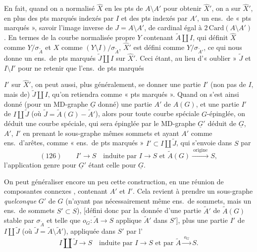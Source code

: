 \documentclass[11pt,a4paper]{article}
\begin{document}
En fait, quand on a normalisé $\hat{X}$ en les pts de $A \setminus A'$ pour obtenir $\hat{X}'$, on a sur $\hat{X}'$, en plus des pts marqués indexés par $I$ et des pts  \struck{\ill{}} indexés par $A'$, un  ens.\ de « pts marqués », savoir l'image inverse  de $J = A \setminus A'$,  de cardinal égal à $2\,\mathrm{Card}(A \setminus A')$. En termes de la courbe normalisée propre $Y$ \struck{\ill{}} contenant $\tilde{A} \amalg I$, qui définit $\hat{X}$ comme $Y/\sigma_{\tilde{A}}$ et $X$ comme $(Y \setminus I)/\sigma_{\tilde{A}}$, $\hat{X}'$ est défini comme $Y/\sigma_{\tilde{A}'}$, ce qui nous donne un ens.\ de pts marqués \struck{\ill{}} $\tilde{J} \amalg I$ sur $\hat{X}'$. Ceci étant, au lieu d'« oublier » $\tilde{J}$ et $I \setminus I'$ pour ne retenir que l'ens.\ de pts marqués

$I'$ sur $\hat{X}'$, on peut aussi, plus généralement, se donner une partie $I'$ (non pas de $I$, mais de) $\tilde{J} \amalg I$, qu'on retiendra comme « pts marqués ». Quand on s'est ainsi donné (pour un \struck{\ill{}} MD-graphe $\underline{G}$ donné) une partie $A'$ de $A(G)$, et une partie $I'$ de $I \amalg \tilde{J}$ (où $\tilde{J} = \tilde{A}(G) - \tilde{A}'$), alors pour toute courbe spéciale $G$-épinglée, on déduit une courbe spéciale, qui sera épinglée par le MD-graphe $\underline{G}'$ déduit de $\underline{G}$, $A'$, $I'$ en prenant le sous-graphe   mêmes sommets et ayant $A'$ comme ens.\ d'arêtes,  comme « ens.\ de pts marqués » $I' \subset I \amalg \tilde{J}$, qui s'envoie dans $S$ \struck{\ill{}} par
\[
(126)\qquad I' \longrightarrow S \quad \text{induite par } I \to S \text{ et } \tilde{A}(G) \xrightarrow{\ \text{origine}\ } S ,
\]
l'application genre pour $\underline{G}'$ étant celle pour $\underline{G}$.

On peut généraliser encore un peu cette construction, en   une réunion de composantes connexes , contenant $A'$ et $I'$. Cela revient à prendre un sous-graphe \emph{quelconque} $G'$ de $G$ (n'ayant pas nécessairement \struck{\ill{}} même ens.\ de sommets, mais un ens.\ de sommets $S' \subset S$), [défini donc par la donnée d'une partie $\tilde{A}'$ de $\tilde{A}(G)$ stable par $\sigma_{\tilde{A}}$ et telle que $o_{G} : \tilde{A} \to S$ applique $\tilde{A}'$ dans $S'$], plus une partie $I'$ de $I \amalg \tilde{J}$ (où $\tilde{J} = \tilde{A} \setminus \tilde{A}'$), appliquée dans $S'$ par l'
\[
I \amalg \tilde{J} \longrightarrow S \quad \text{induite par } I \to S \text{ et par } \tilde{A} \xrightarrow{\ o_{G}\ } S .
\]
\end{document}
